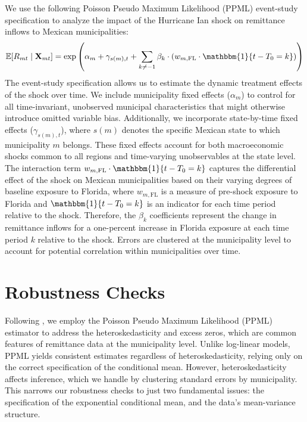 We use the following Poisson Pseudo Maximum Likelihood (PPML) event-study specification to analyze the impact of the Hurricane Ian shock on remittance inflows to Mexican municipalities:
\begin{equation} \label{eq:ppml-event-study}
\mathbb{E}[R_{mt} \mid \mathbf{X}_{mt}] = \exp \left( \alpha_m + \gamma_{s(m),t} + \sum_{k \neq -1} \beta_k \cdot \left( w_{m,\text{FL}} \cdot \mathbbm{1}\{t - T_0 = k\} \right) \right)
\end{equation}
The event-study specification allows us to estimate the dynamic treatment effects of the shock over time. We include municipality fixed effects ($\alpha_m$) to control for all time-invariant, unobserved municipal characteristics that might otherwise introduce omitted variable bias. Additionally, we incorporate state-by-time fixed effects ($\gamma_{s(m),t}$), where $s(m)$ denotes the specific Mexican state to which municipality $m$ belongs. These fixed effects account for both macroeconomic shocks common to all regions and time-varying unobservables at the state level. The interaction term $w_{m,\text{FL}} \cdot \mathbbm{1}\{t - T_0 = k \}$ captures the differential effect of the shock on Mexican municipalities based on their varying degrees of baseline exposure to Florida, where $w_{m,\text{FL}}$ is a measure of pre-shock exposure to Florida and $\mathbbm{1}\{t - T_0 = k \}$ is an indicator for each time period relative to the shock. Therefore, the $\beta_k$ coefficients represent the change in remittance inflows for a one-percent increase in Florida exposure at each time period $k$ relative to the shock. Errors are clustered at the municipality level to account for potential correlation within municipalities over time.

\section{Robustness Checks}

Following \textcite{silva_tenreyro_2006}, we employ the Poisson Pseudo Maximum Likelihood (PPML) estimator to address the heteroskedasticity and excess zeros, which are common features of remittance data at the municipality level. Unlike log-linear models, PPML yields consistent estimates regardless of heteroskedasticity, relying only on the correct specification of the conditional mean. However, heteroskedasticity affects inference, which we handle by clustering standard errors by municipality. This narrows our robustness checks to just two fundamental issues: the specification of the exponential conditional mean, and the data's mean-variance structure.

